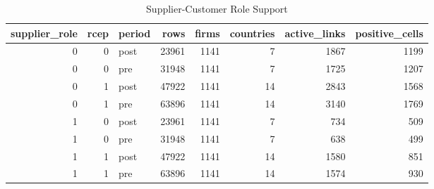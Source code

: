 \begin{table}
\caption{Supplier-Customer Role Support}
\label{tab:table1_support_gate}
\begin{tabular}{rrlrrrrr}
\toprule
supplier_role & rcep & period & rows & firms & countries & active_links & positive_cells \\
\midrule
0 & 0 & post & 23961 & 1141 & 7 & 1867 & 1199 \\
0 & 0 & pre & 31948 & 1141 & 7 & 1725 & 1207 \\
0 & 1 & post & 47922 & 1141 & 14 & 2843 & 1568 \\
0 & 1 & pre & 63896 & 1141 & 14 & 3140 & 1769 \\
1 & 0 & post & 23961 & 1141 & 7 & 734 & 509 \\
1 & 0 & pre & 31948 & 1141 & 7 & 638 & 499 \\
1 & 1 & post & 47922 & 1141 & 14 & 1580 & 851 \\
1 & 1 & pre & 63896 & 1141 & 14 & 1574 & 930 \\
\bottomrule
\end{tabular}
\end{table}
